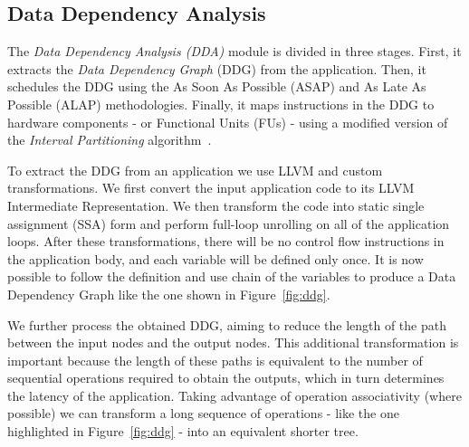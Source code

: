 \subsection{Data Dependency Analysis}
\label{ssec:dda}
The \textit{Data Dependency Analysis (DDA)} module is divided in three stages. First, it extracts the \textit{Data Dependency Graph} (DDG)\cite{isoda1983global} from the application. Then, it schedules the DDG using the As Soon As Possible (ASAP) and As Late As Possible (ALAP) methodologies. Finally, it maps instructions in the DDG to hardware components - or Functional Units (FUs) - using a modified version of the \textit{Interval Partitioning} algorithm~\cite{greedyIntervalPartitioning}.

To extract the DDG from an application we use LLVM  and custom transformations. We first convert the input application code to its LLVM Intermediate Representation. We then transform the code into static single assignment (SSA) form and perform full-loop unrolling on all of the application loops. After these transformations, there will be no control flow instructions in the application body, and each variable will be defined only once. It is now possible to follow the definition and use chain of the variables to produce a Data Dependency Graph like the one shown in Figure~\ref{fig:ddg}. 

We further process the obtained DDG, aiming to reduce the length of the path between the input nodes and the output nodes. This additional transformation is important because the length of these paths is equivalent to the number of sequential operations required to obtain the outputs, which in turn determines the latency of the application. Taking advantage of operation associativity (where possible) we can transform a long sequence of operations - like the one highlighted in Figure~\ref{fig:ddg} - into an equivalent shorter tree.

